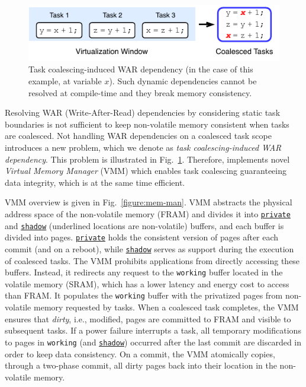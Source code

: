 \begin{figure}
	\centering
	\includegraphics[width=0.8\columnwidth]{figures/coalesced-war.pdf}
	\caption{Task coalescing-induced WAR dependency (in the case of this example, at variable $x$). Such dynamic dependencies cannot be resolved at compile-time and they break memory consistency.}
	\label{figure:coalescedWar}
\end{figure}

Resolving WAR (Write-After-Read) dependencies by considering static task boundaries is not sufficient to keep non-volatile memory consistent when tasks are coalesced. Not handling WAR dependencies on a coalesced task scope introduces a new problem, which we denote as \emph{task coalescing-induced WAR dependency}. This problem is illustrated in Fig.~\ref{figure:coalescedWar}. Therefore, \sys implements novel {\em Virtual Memory Manager} (VMM) which enables task coalescing guaranteeing data integrity, which is at the same time efficient.

VMM overview is given in Fig.~\ref{figure:mem-man}.
VMM abstracts the physical address space of the non-volatile memory (FRAM) and divides it into \texttt{\underline{private}} and \texttt{\underline{shadow}} (underlined locations are non-volatile) buffers, and each buffer is divided into pages.
\texttt{\underline{private}} holds the consistent version of pages after each commit (and on a reboot), while \texttt{\underline{shadow}} serves as support during the execution of coalesced tasks.
The VMM prohibits applications from directly accessing these buffers.
Instead, it redirects any request to the \texttt{working} buffer located in the volatile memory (SRAM), which has a lower latency and energy cost to access than FRAM.
It populates the \texttt{working} buffer with the privatized pages from non-volatile memory requested by tasks.
When a coalesced task completes, the VMM ensures that {\em dirty}, i.e., modified, pages are committed to FRAM and visible to subsequent tasks.
If a power failure interrupts a task, all temporary modifications to pages in \texttt{working} (and \texttt{\underline{shadow}}) occurred after the last commit are discarded in order to keep data consistency.
On a commit, the VMM atomically copies, through a two-phase commit, all dirty pages back into their location in the non-volatile memory.

